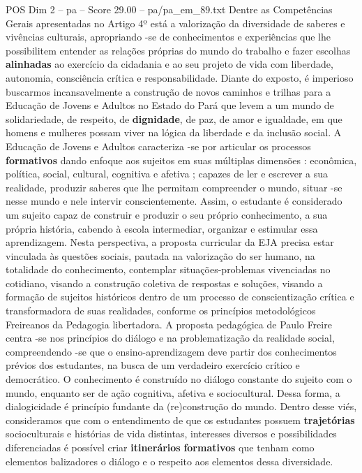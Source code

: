 \begin{textsample}{POS Dim 2 – pa – Score 29.00 – pa/pa\_em\_89.txt}
Dentre as Competências Gerais apresentadas no Artigo 4º está a valorização da diversidade de saberes e vivências culturais, apropriando -se de conhecimentos e experiências que lhe possibilitem entender as relações próprias do mundo do trabalho e fazer escolhas \textbf{alinhadas} ao exercício da cidadania e ao seu projeto de vida com liberdade, autonomia, consciência crítica e responsabilidade.
Diante do exposto, é imperioso buscarmos incansavelmente a construção de novos caminhos e trilhas para a Educação de Jovens e Adultos no Estado do Pará que levem a um mundo de solidariedade, de respeito, de \textbf{dignidade}, de paz, de amor e igualdade, em que homens e mulheres possam viver na lógica da liberdade e da inclusão social.
A Educação de Jovens e Adultos caracteriza -se por articular os processos \textbf{formativos} dando enfoque aos sujeitos em suas múltiplas dimensões : econômica, política, social, cultural, cognitiva e afetiva ; capazes de ler e escrever a sua realidade, produzir saberes que lhe permitam compreender o mundo, situar -se nesse mundo e nele intervir conscientemente.
Assim, o estudante é considerado um sujeito capaz de construir e produzir o seu próprio conhecimento, a sua própria história, cabendo à escola intermediar, organizar e estimular essa aprendizagem.
Nesta perspectiva, a proposta curricular da EJA precisa estar vinculada às questões sociais, pautada na valorização do ser humano, na totalidade do conhecimento, contemplar situações-problemas vivenciadas no cotidiano, visando a construção coletiva de respostas e soluções, visando a formação de sujeitos históricos dentro de um processo de conscientização crítica e transformadora de suas realidades, conforme os princípios metodológicos Freireanos da Pedagogia libertadora.
A proposta pedagógica de Paulo Freire centra -se nos princípios do diálogo e na problematização da realidade social, compreendendo -se que o ensino-aprendizagem deve partir dos conhecimentos prévios dos estudantes, na busca de um verdadeiro exercício crítico e democrático.
O conhecimento é construído no diálogo constante do sujeito com o mundo, enquanto ser de ação cognitiva, afetiva e sociocultural.
Dessa forma, a dialogicidade é princípio fundante da (re)construção do mundo.
Dentro desse viés, consideramos que com o entendimento de que os estudantes possuem \textbf{trajetórias} socioculturais e histórias de vida distintas, interesses diversos e possibilidades diferenciadas é possível criar \textbf{itinerários} \textbf{formativos} que tenham como elementos balizadores o diálogo e o respeito aos elementos dessa diversidade.

\end{textsample}
